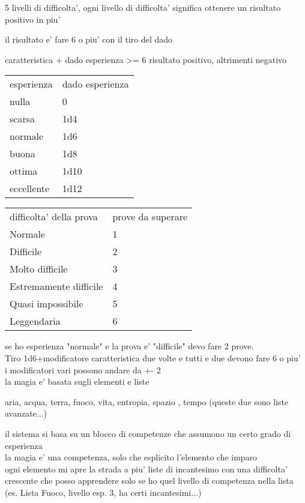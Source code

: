 \documentclass[12pt,a4paper]{book}
\begin{document}
	
5 livelli di difficolta', ogni livello di difficolta' significa ottenere un risultato positivo in piu'

il risultato e' fare 6 o piu' con il tiro del dado

caratteristica  + dado esperienza >= 6 risultato positivo, altrimenti negativo

\medskip

\begin{tabular}{ll}
	\hline
esperienza & dado esperienza\\
nulla		&	0	\\
scarsa		&	1d4	\\
normale		&   1d6	\\
buona		&	1d8	\\
ottima		&	1d10\\	
eccellente	&	1d12\\
\end{tabular}

\medskip

\begin{tabular}{ll}
	\hline
difficolta' della prova & prove da superare\\
	Normale          			& 1\\
	Difficile        			& 2\\
	Molto difficile 	 		& 3\\
	Estremamente difficile      & 4\\
	Quasi impossibile			& 5\\
	Leggendaria      			& 6\\
\end{tabular}

\medskip

se ho esperienza "normale" e la prova e' "difficile" devo fare 2 prove.\\

Tiro 1d6+modificatore caratteristica due volte e tutti e due devono fare 6 o piu'\\

i modificatori vari possono andare da +- 2\\

la magia e' basata sugli elementi e liste

aria, acqua, terra, fuoco, vita, entropia, spazio , tempo (queste due sono liste avanzate...)
	
il sistema	si basa su un blocco di competenze che assumono un certo grado di esperienza\\

la magia e' una competenza, solo che esplicito l'elemento che imparo\\
ogni elemento mi apre la strada a piu' liste di incantesimo con una difficolta' crescente che posso apprendere solo se ho quel livello di competenza nella lista (es. Lista Fuoco, livello esp. 3, ha certi incantesimi...)\\
\end{document}
